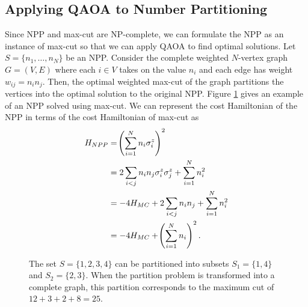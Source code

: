     \subsection{Applying QAOA to Number Partitioning}

    Since NPP and max-cut are NP-complete, we can formulate the NPP as an instance of max-cut so that we can apply QAOA to find optimal solutions. Let $S=\{n_1,\dots,n_N\}$ be an NPP. Consider the complete weighted $N$-vertex graph $G=(V,E)$ where each $i\in V$ takes on the value $n_i$ and each edge has weight $w_{ij} = n_in_j$. Then, the optimal weighted max-cut of the graph partitions the vertices into the optimal solution to the original NPP. Figure \ref{fig:number_maxcut} gives an example of an NPP solved using max-cut. We can represent the cost Hamiltonian of the NPP in terms of the cost Hamiltonian of max-cut as
    \begin{align} \label{eq:cost}
        H_{NPP} &= \lr(){\sum^N_{i=1}n_i\sigma_i^z}^2 \nonumber \\ 
        &= 2\sum_{i<j}n_in_j\sigma_i^z\sigma_j^z + \sum^N_{i=1}n_i^2  \nonumber\\ 
        &= -4H_{MC} + 2\sum_{i<j}n_in_j + \sum^N_{i=1}n_i^2  \nonumber \\ 
        &= -4H_{MC} + \lr(){\sum^N_{i=1}n_i}^2.
    \end{align}

    \begin{figure}
        \begin{center}
        \vspace{1cm}
        \end{center}
        \vspace{0.4cm}
        \caption{The set $S=\{1,2,3,4\}$ can be partitioned into subsets $S_1=\{1,4\}$ and $S_2=\{2,3\}$. When the partition problem is transformed into a complete graph, this partition corresponds to the maximum cut of $12+3+2+8= 25$.}
        \label{fig:number_maxcut}
    \end{figure}

